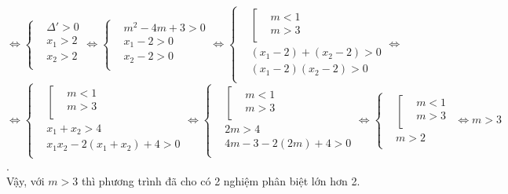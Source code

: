 \begin{ex}
{		$\Leftrightarrow \left\{{\begin{aligned}&{\Delta '>0} \\ &{x_1>2} \\ &{x_2>2} \\ \end{aligned}\Leftrightarrow}\right.\left\{{\begin{aligned}&{m^2-4m+3>0} \\ &{x_1-2>0} \\ &{x_2-2>0} \\ \end{aligned}\Leftrightarrow}\right.\left\{{\begin{aligned}&{\left[{\begin{aligned}&{m<1} \\ &{m>3} \\ \end{aligned}}\right.} \\ &{\left({x_1-2}\right)+\left({x_2-2}\right)>0} \\ &{\left({x_1-2}\right)\left({x_2-2}\right)>0} \\ \end{aligned}\Leftrightarrow}\right.$\\$\Leftrightarrow\left\{{\begin{aligned}&{\left[{\begin{aligned}&{m<1}\\&{m>3}\\\end{aligned}}\right.}\\&{x_1+x_2>4}\\&{x_1x_2-2\left({x_1+x_2}\right)+4>0}\\\end{aligned}}\right.\Leftrightarrow\left\{{\begin{aligned}&{\left[{\begin{aligned}&{m<1}\\&{m>3}\\\end{aligned}}\right.}\\&{2m>4}\\&{4m-3-2\left({2m}\right)+4>0}\\\end{aligned}}\right.\Leftrightarrow\left\{{\begin{aligned}&{\left[{\begin{aligned}&{m<1}\\&{m>3}\\\end{aligned}}\right.}\\&{m>2}\\\end{aligned}}\right.\Leftrightarrow m>3$.	\\
		Vậy, với $m > 3$ thì phương trình đã cho có 2 nghiệm phân biệt  lớn hơn 2.
	}
\end{ex}
